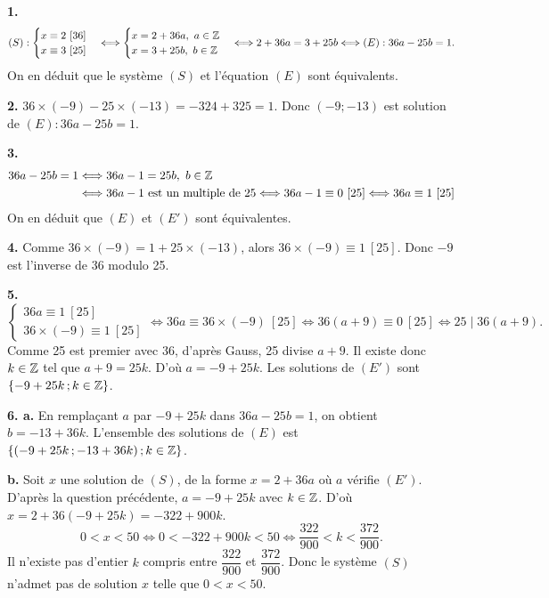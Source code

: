 \documentclass[11pt]{article}
\begin{document}


\textbf{1.}
\[ (S) : \begin{cases} x \equiv 2\ [36] \\ x \equiv 3\ [25] \end{cases} \Longleftrightarrow \begin{cases} x = 2 + 36a,\ a \in \mathbb{Z} \\ x = 3 + 25b,\ b \in \mathbb{Z} \end{cases} \Longleftrightarrow 2 + 36a = 3 + 25b \Longleftrightarrow (E) : 36a - 25b = 1. \]
On en déduit que le système $(S)$ et l'équation $(E)$ sont équivalents.

\textbf{2.} $36 \times (-9) - 25 \times (-13) = -324 + 325 = 1$. Donc $(-9;-13)$ est solution de $(E) : 36a - 25b = 1$.

\textbf{3.}
\begin{align*}
36a - 25b = 1 &\Longleftrightarrow 36a - 1 = 25b,\ b \in \mathbb{Z} \\
&\Longleftrightarrow 36a - 1 \text{ est un multiple de } 25 \Longleftrightarrow 36a - 1 \equiv 0\ [25] \Longleftrightarrow 36a \equiv 1\ [25]
\end{align*}
On en déduit que $(E)$ et $(E')$ sont équivalentes.

\textbf{4.} Comme $36 \times (-9) = 1 + 25 \times (-13)$, alors $36 \times (-9) \equiv 1\ [25]$. Donc $-9$ est l'inverse de 36 modulo 25.

\textbf{5.}
\[ \begin{cases} 36a \equiv 1\ [25] \\ 36 \times (-9) \equiv 1\ [25] \end{cases} \Longleftrightarrow 36a \equiv 36 \times (-9)\ [25] \Longleftrightarrow 36(a + 9) \equiv 0\ [25] \Longleftrightarrow 25 \mid 36(a + 9). \]
Comme 25 est premier avec 36, d'après Gauss, 25 divise $a + 9$. Il existe donc $k \in \mathbb{Z}$ tel que $a + 9 = 25k$. D'où $a = -9 + 25k$. Les solutions de $(E')$ sont $\{-9 + 25k\,;k \in \mathbb{Z}\}$.

\textbf{6. a.} En remplaçant $a$ par $-9 + 25k$ dans $36a - 25b = 1$, on obtient $b = -13 + 36k$. L'ensemble des solutions de $(E)$ est $\{(-9 + 25k\,;-13 + 36k)\,;k \in \mathbb{Z}\}$.

\textbf{b.} Soit $x$ une solution de $(S)$, de la forme $x = 2 + 36a$ où $a$ vérifie $(E')$. D'après la question précédente, $a = -9 + 25k$ avec $k \in \mathbb{Z}$. D'où $x = 2 + 36(-9 + 25k) = -322 + 900k$.
\[ 0 < x < 50 \Longleftrightarrow 0 < -322 + 900k < 50 \Longleftrightarrow \frac{322}{900} < k < \frac{372}{900}. \]
Il n'existe pas d'entier $k$ compris entre $\dfrac{322}{900}$ et $\dfrac{372}{900}$. Donc le système $(S)$ n'admet pas de solution $x$ telle que $0 < x < 50$.
\end{document}
